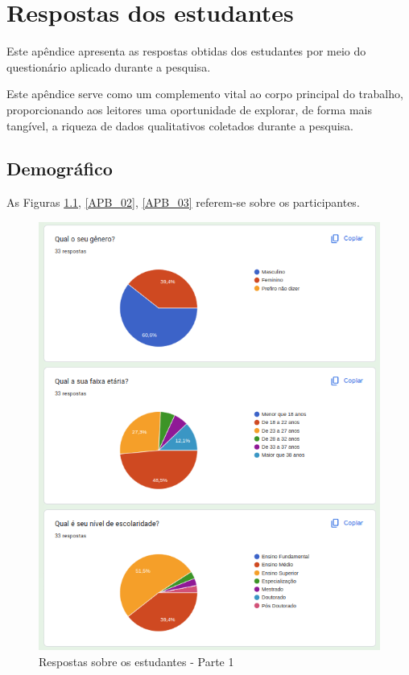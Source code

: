 \chapter{Respostas dos estudantes}\label{respostas_dos_estudantes}

Este apêndice apresenta as respostas obtidas dos estudantes por meio do questionário aplicado durante a pesquisa. 

Este apêndice serve como um complemento vital ao corpo principal do trabalho, proporcionando aos leitores uma oportunidade de explorar, de forma mais tangível, a riqueza de dados qualitativos coletados durante a pesquisa.

\newpage

\section{Demográfico}

As Figuras \ref{APB_01}, \ref{APB_02}, \ref{APB_03} referem-se sobre os participantes.

\begin{figure}[!h]
	\begin{center}
	    \includegraphics[scale=0.7]{figs/Answers/Students/01.png}
	\end{center}
	\caption{\label{APB_01}Respostas sobre os estudantes - Parte 1}
\end{figure}

